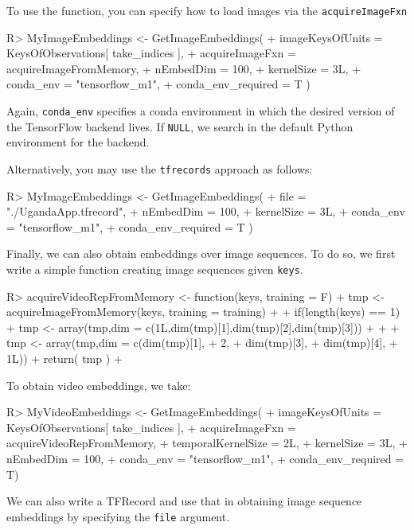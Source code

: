 \documentclass[nojss,shortnames]{jss} %
\begin{document}
To use the function, you can specify how to load images via the \texttt{acquireImageFxn}
\begin{CodeChunk}
\begin{CodeInput}
R> MyImageEmbeddings <- GetImageEmbeddings(
+    imageKeysOfUnits = KeysOfObservations[ take_indices ],
+    acquireImageFxn = acquireImageFromMemory,
+    nEmbedDim = 100,
+    kernelSize = 3L,
+    conda_env = "tensorflow_m1",
+    conda_env_required = T
)
\end{CodeInput}
\end{CodeChunk}
Again, \verb|conda_env| specifies a conda environment in which the desired version of the TensorFlow backend lives. If \texttt{NULL}, we search in the default Python environment for the backend. 

Alternatively, you may use the \texttt{tfrecords} approach as follows: 
\begin{CodeChunk}
\begin{CodeInput}
R> MyImageEmbeddings <- GetImageEmbeddings(
+    file = "./UgandaApp.tfrecord",
+    nEmbedDim = 100,
+    kernelSize = 3L,
+    conda_env = "tensorflow_m1",
+    conda_env_required = T
)
\end{CodeInput}
\end{CodeChunk}

Finally, we can also obtain embeddings over image sequences. To do so, we first write a simple function creating image sequences given \verb|keys|.
\begin{CodeChunk}
\begin{CodeInput}
R> acquireVideoRepFromMemory <- function(keys, training = F){
+    tmp <- acquireImageFromMemory(keys, training = training)
+ 
+    if(length(keys) == 1){
+        tmp <- array(tmp,dim = c(1L,dim(tmp)[1],dim(tmp)[2],dim(tmp)[3]))
+    }
+ 
+    tmp <- array(tmp,dim = c(dim(tmp)[1],
+                             2,
+                             dim(tmp)[3],
+                             dim(tmp)[4],
+                             1L))
+    return(  tmp  )
+}
\end{CodeInput}
\end{CodeChunk}
To obtain video embeddings, we  take: 
\begin{CodeChunk}
\begin{CodeInput}
R> MyVideoEmbeddings <- GetImageEmbeddings(
+    imageKeysOfUnits = KeysOfObservations[ take_indices ],
+    acquireImageFxn = acquireVideoRepFromMemory,
+    temporalKernelSize = 2L,
+    kernelSize = 3L,
+    nEmbedDim = 100,
+    conda_env = "tensorflow_m1",
+    conda_env_required = T)
\end{CodeInput}
\end{CodeChunk}
We can also write a TFRecord and use that in obtaining image sequence embeddings by specifying the \texttt{file} argument. 
\end{document}
